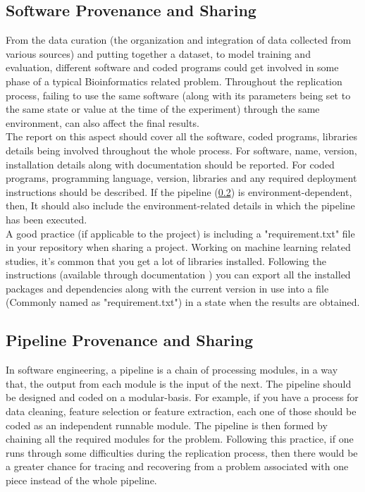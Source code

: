 \subsection{Software Provenance and Sharing}
    \label{sec:softwareProvenance}

    From the data curation (the organization and integration of data collected from various sources)
    and putting together a dataset, to model training and evaluation, different software and coded programs 
    could get involved in some phase of a typical Bioinformatics related problem. 
    Throughout the replication process, failing to use the same software (along with its parameters 
    being set to the same state or value at the time of the experiment) through the same environment, can also affect the final results. \\
    
    The report on this aspect should cover all the software, coded programs, libraries details being involved throughout the whole process. 
    For software, name, version, installation details along with documentation should be reported.
    For coded programs, programming language, version, libraries and any required deployment instructions should be described.
    If the pipeline (\ref{sec:PipelineProvenance}) is environment-dependent, then, It should also include the environment-related 
    details in which the pipeline has been executed.\\

    A good practice (if applicable to the project) is including a "requirement.txt" file in your repository when sharing a project. 
    Working on machine learning related studies, it’s common that you get a lot of libraries installed. 
    Following the instructions (available through documentation \cite{pipDoc}) you can export all the 
    installed packages and dependencies along with the current version in use into a file (Commonly named as "requirement.txt") in a state when
    the results are obtained.
    

\subsection{Pipeline Provenance and Sharing}
    \label{sec:PipelineProvenance}
    
    In software engineering, a pipeline is a chain of processing modules, in a way that, the output from each module is the 
    input of the next. The pipeline should be designed and coded on a modular-basis. For example, if you have a process for data cleaning, 
    feature selection or feature extraction, each one of those should be coded as an independent runnable module. The pipeline is then formed 
    by chaining all the required modules for the problem. Following this practice, if one runs through some difficulties during the replication process, 
    then there would be a greater chance for tracing and recovering from a problem associated with one piece instead of the 
    whole pipeline.\\
    
